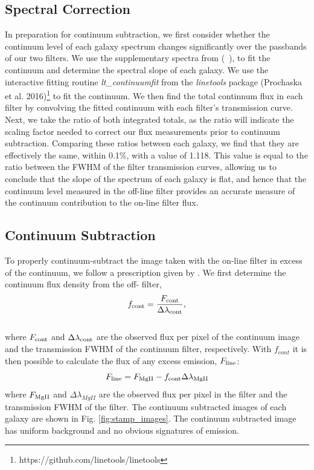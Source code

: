 \documentclass[twocolumn]{aastex61}
\newcommand{\citeth}[1]{(\citeauthor{#1}\ \citeyear{#1})}
\begin{document}
\subsection{Spectral Correction}
In preparation for continuum subtraction, we first consider whether the continuum level of each galaxy spectrum changes significantly over the passbands of our two filters.
We use the supplementary spectra from \citeth{Rubin_2014}, to fit the continuum and determine the spectral slope of each galaxy. We use the interactive fitting routine \emph{lt\_continuumfit} from the \emph{linetools} package (Prochaska et al. 2016)\footnote{https://github.com/linetools/linetools}\nocite{Prochaska2016} to fit the continuum. We then find the total continnum flux in each filter by convolving the fitted continuum with each filter's transmission curve. Next, we take the ratio of both integrated totals, as the ratio will indicate the scaling factor needed to correct our flux measurements prior to continuum subtraction. Comparing these ratios between each galaxy, we find that they are effectively the same, within 0.1\%, with a value of 1.118. This value is equal to the ratio between the FWHM of the filter transmission curves, allowing us to conclude that the slope of the spectrum of each galaxy is flat, and hence that the continuum level measured in the off-line filter provides an accurate measure of the continuum contribution to the on-line filter flux.

\subsection{Continuum Subtraction}
To properly continuum-subtract the image taken with the on-line filter in excess of the continuum, we follow a prescription given by \cite{Battaia_2015}. 
We first determine the continuum flux density from the off- filter,
\begin{equation}
f_{\rm{cont}}=\frac{F_{\rm{cont}}}{\Delta \lambda_{\rm{cont}}},
\end{equation}\\
where $F_{\rm{cont}}$ and $\Delta \lambda_{\rm{cont}}$ are the observed flux per pixel of the continuum image and the transmission FWHM of the continuum filter, respectively. With $f_{cont}$ it is then possible to calculate the flux of any excess emission, $F_{\rm{line}}$:
\begin{equation}
F_{\rm{line}}=F_{\rm{MgII}}-f_{\rm{cont}} \Delta \lambda_{\rm{MgII}}
\label{eq:subtraction}
\end{equation}
where $F_{\rm{MgII}}$ and $\Delta \lambda_{MgII}$ are the observed flux per pixel in the  filter and the transmission FWHM of the  filter. The continuum subtracted images of each galaxy are shown in Fig. \ref{fig:stamp_images}. The continuum subtracted image has uniform background and no obvious signatures of emission.
\end{document}
